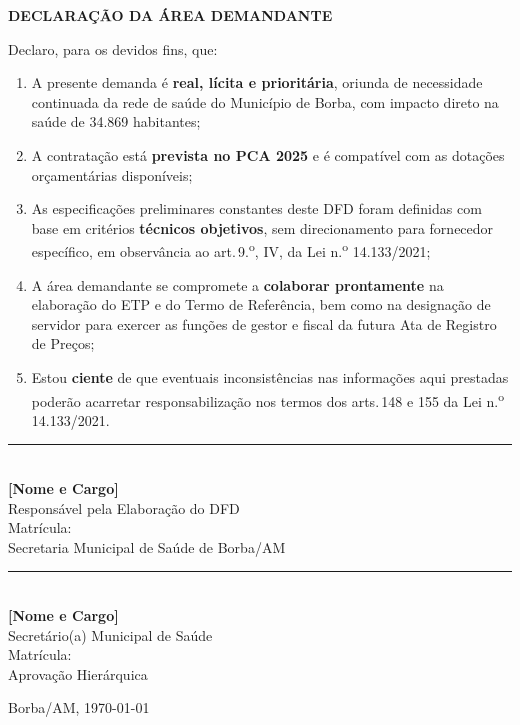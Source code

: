 \documentclass[12pt,a4paper]{article}
\newcommand{\assinatura}[3]{%
  \begin{center}
    \vspace{0.2cm}
    \rule{7cm}{0.5pt}\\[3pt]
    \textbf{#1}\\
    \small #2\\
    \small Matrícula: \underline{\hspace{2.5cm}}\\
    \small #3
  \end{center}}
\newcommand{\exercicio}{2025}
\begin{document}
\begin{conclusabox}
\begin{center}
  \textbf{\color{navy}\large DECLARAÇÃO DA ÁREA DEMANDANTE}
\end{center}
\medskip
Declaro, para os devidos fins, que:

\begin{enumerate}
  \item A presente demanda é \textbf{real, lícita e prioritária}, oriunda de necessidade
    continuada da rede de saúde do Município de Borba, com impacto direto na saúde de
    34.869 habitantes;
  \item A contratação está \textbf{prevista no PCA \exercicio} e é compatível com as
    dotações orçamentárias disponíveis;
  \item As especificações preliminares constantes deste DFD foram definidas com base
    em critérios \textbf{técnicos objetivos}, sem direcionamento para fornecedor
    específico, em observância ao art.\,9.\textsuperscript{o}, IV, da Lei
    n.\textsuperscript{o} 14.133/2021;
  \item A área demandante se compromete a \textbf{colaborar prontamente} na elaboração
    do ETP e do Termo de Referência, bem como na designação de servidor para exercer
    as funções de gestor e fiscal da futura Ata de Registro de Preços;
  \item Estou \textbf{ciente} de que eventuais inconsistências nas informações aqui
    prestadas poderão acarretar responsabilização nos termos dos arts.\,148 e 155
    da Lei n.\textsuperscript{o} 14.133/2021.
\end{enumerate}
\end{conclusabox}

\vspace{1.5cm}

\begin{minipage}{0.47\linewidth}
\assinatura{[Nome e Cargo]}{Responsável pela Elaboração do DFD}{Secretaria Municipal de Saúde de Borba/AM}
\end{minipage}
\hfill
\begin{minipage}{0.47\linewidth}
\assinatura{[Nome e Cargo]}{Secretário(a) Municipal de Saúde}{Aprovação Hierárquica}
\end{minipage}

\vspace{1cm}
\noindent\hfill{\small Borba/AM, \today}
\end{document}
